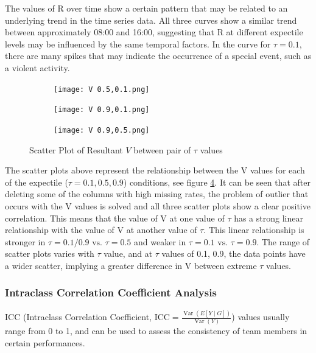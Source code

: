 \documentclass{article}
\begin{document}
The values of R over time show a certain pattern that may be related to an underlying trend in the time series data. All three curves show a similar trend between approximately 08:00 and 16:00, suggesting that R at different expectile levels may be influenced by the same temporal factors. In the curve for $\tau = 0.1$, there are many spikes that may indicate the occurrence of a special event, such as a violent activity.

\clearpage
\begin{figure}[ht]
  \centering
  \begin{subfigure}[b]{15cm}
    \centering
    \texttt{[image: V 0.5,0.1.png]} 
    \label{fig:sub1}
  \end{subfigure}
  \hfill
  \begin{subfigure}[b]{15cm}
    \centering
    \texttt{[image: V 0.9,0.1.png]}
    \label{fig:sub2}
  \end{subfigure}
  \hfill
  \begin{subfigure}[b]{15cm}
    \centering
    \texttt{[image: V 0.9,0.5.png]}
    \label{fig:sub3}
  \end{subfigure}
  \caption{Scatter Plot of Resultant $V$ between pair of $\tau$ values}
  \label{fig:V}
\end{figure}
\FloatBarrier
The scatter plots above represent the relationship between the V values for each of the expectile ($\tau = 0.1, 0.5, 0.9$) conditions, see figure \ref{fig:V}.
It can be seen that after deleting some of the columns with high missing rates, the problem of outlier that occurs with the V values is solved and all three scatter plots show a clear positive correlation. This means that the value of V at one value of $\tau$ has a strong linear relationship with the value of V at another value of $\tau$. This linear relationship is stronger in $\tau = 0.1/0.9 \text{ vs. } \tau = 0.5$ and weaker in $\tau = 0.1 \text{ vs. }  \tau = 0.9$. The range of scatter plots varies with $\tau$ value, and at $\tau$ values of 0.1, 0.9, the data points have a wider scatter, implying a greater difference in V between extreme $\tau$ values.

\subsubsection{Intraclass Correlation Coefficient Analysis}
ICC (Intraclass Correlation Coefficient, $\mathrm{ICC}=\frac{\operatorname{Var}(E[Y \mid G])}{\operatorname{Var}(Y)}$) values usually range from 0 to 1, and can be used to assess the consistency of team members in certain performances. 
\end{document}
